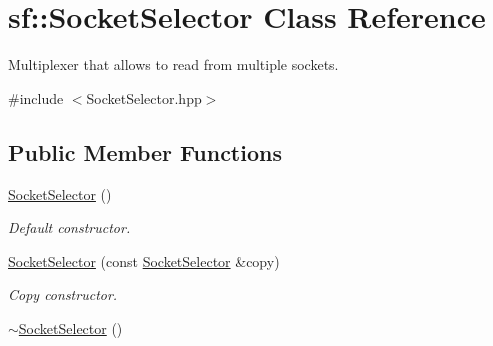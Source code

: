 \hypertarget{classsf_1_1SocketSelector}{\section{sf\-:\-:Socket\-Selector Class Reference}
\label{classsf_1_1SocketSelector}
}


Multiplexer that allows to read from multiple sockets.  




{\ttfamily \#include $<$Socket\-Selector.\-hpp$>$}

\subsection*{Public Member Functions}
\begin{DoxyCompactItemize}
\item 
\hypertarget{classsf_1_1SocketSelector_a741959c5158aeb1e4457cad47d90f76b}{\hyperlink{classsf_1_1SocketSelector_a741959c5158aeb1e4457cad47d90f76b}{Socket\-Selector} ()}\label{classsf_1_1SocketSelector_a741959c5158aeb1e4457cad47d90f76b}

\begin{DoxyCompactList}\small\item\em Default constructor. \end{DoxyCompactList}\item 
\hyperlink{classsf_1_1SocketSelector_a50b1b955eb7ecb2e7c2764f3f4722fbf}{Socket\-Selector} (const \hyperlink{classsf_1_1SocketSelector}{Socket\-Selector} \&copy)
\begin{DoxyCompactList}\small\item\em Copy constructor. \end{DoxyCompactList}\item 
\hypertarget{classsf_1_1SocketSelector_a9069cd61208260b8ed9cf233afa1f73d}{\hyperlink{classsf_1_1SocketSelector_a9069cd61208260b8ed9cf233afa1f73d}{$\sim$\-Socket\-Selector} ()}\label{classsf_1_1SocketSelector_a9069cd61208260b8ed9cf233afa1f73d}


\end{DoxyCompactItemize}
